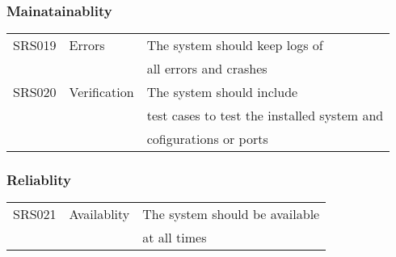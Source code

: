 \subsubsection{Mainatainablity}
\begin{tabular}{ll|l}
	SRS019 & Errors & The system should keep logs of\\
	~ & ~ & all errors and crashes\\
	SRS020 & Verification & The system should include \\
	~ & ~ & test cases to test the installed system and \\
	~ & ~ & cofigurations or ports
\end{tabular}

\subsubsection{Reliablity}
\begin{tabular}{ll|l}
	SRS021 & Availablity & The system should be available\\
	~ & ~ & at all times
\end{tabular}

